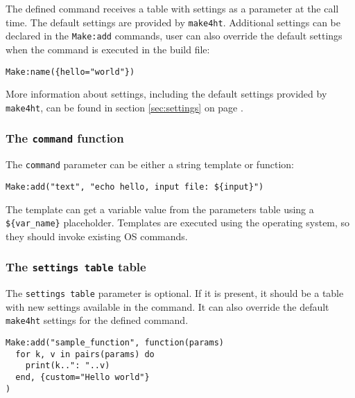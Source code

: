 The defined command receives a table with settings as a parameter at the
call time. The default settings are provided by \texttt{make4ht}.
Additional settings can be declared in the \texttt{Make:add} commands,
user can also override the default settings when the command is executed
in the build file:

\begin{verbatim}
Make:name({hello="world"})
\end{verbatim}

More information about settings, including the default settings provided
by \texttt{make4ht}, can be found in section \ref{sec:settings} on page
\pageref{sec:settings}.

\hypertarget{the-command-function}{%
\subsubsection{\texorpdfstring{The \texttt{command}
function}{The command function}}\label{the-command-function}}

\label{sec:commandfunction}

The \texttt{command} parameter can be either a string template or
function:

\begin{verbatim}
Make:add("text", "echo hello, input file: ${input}")
\end{verbatim}

The template can get a variable value from the parameters table using a
\texttt{\$\{var\_name\}} placeholder. Templates are executed using the
operating system, so they should invoke existing OS commands.

\hypertarget{the-settings-table-table}{%
\subsubsection{\texorpdfstring{The \texttt{settings\ table}
table}{The settings table table}}\label{the-settings-table-table}}

The \texttt{settings\ table} parameter is optional. If it is present, it
should be a table with new settings available in the command. It can
also override the default \texttt{make4ht} settings for the defined
command.

\begin{verbatim}
Make:add("sample_function", function(params) 
  for k, v in pairs(params) do 
    print(k..": "..v) 
  end, {custom="Hello world"}
)
\end{verbatim}

